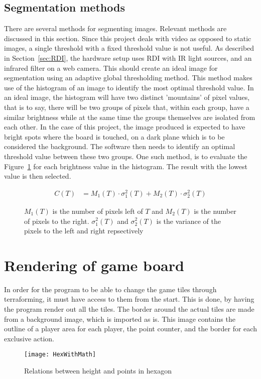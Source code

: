 \subsection{Segmentation methods}
There are several methods for segmenting images. Relevant methods are discussed in this section. Since this project deals with video as opposed to static images, a single threshold with a fixed threshold value is not useful. As described in Section~\ref{sec:RDI}, the hardware setup uses RDI with IR light sources, and an  infrared filter on a web camera. This should create an ideal image for segmentation using an adaptive global thresholding method. This method makes use of the histogram of an image to identify the most optimal threshold value\citep{Moeslund2012c4}. In an ideal image, the histogram will have two distinct 'mountains' of pixel values, that is to say, there will be two groups of pixels that, within each group, have a similar brightness while at the same time the groups themselves are isolated from each other. In the case of this project, the image produced is expected to have bright spots where the board is touched, on a dark plane which is to be considered the background. The software then needs to identify an optimal threshold value between these two groups. One such method, is to evaluate the Figure~\ref{eq:otsu} for each brightness value in the histogram. The result with the lowest value is then selected.
\begin{figure}[h]
	\begin{align*}
	C(T)&=M_1(T)\cdot\sigma_1^2(T)+M_2(T)\cdot\sigma_2^2(T)
	\end{align*}
	\caption{$M_1(T)$ is the number of pixels left of $T$ and $M_2(T)$ is the number of pixels to the right. $\sigma_1^2(T)$ and $\sigma_2^2(T)$ is the variance of the pixels to the left and right repsectively \label{eq:otsu} \citep[p. 61]{moeslund_introduction_2012_chapter_5}}
\end{figure}

\section{Rendering of game board}
In order for the program to be able to change the game tiles through terraforming, it must have access to them from the start. This is done, by having the program render out all the tiles. The border around the actual tiles are made from a background image, which is imported as is. This image contains the outline of a player area for each player, the point counter, and the border for each exclusive action. 
\begin{figure}[h!]
\centering \texttt{[image: HexWithMath]}
\caption{Relations between height and points in hexagon \label{Fig:HexWithMath}}
\end{figure}

